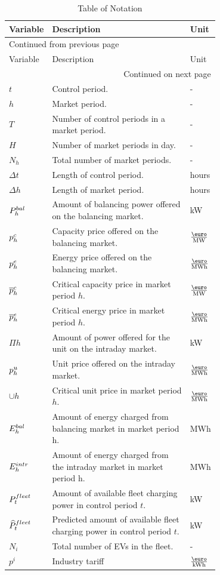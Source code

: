 \documentclass[a4paper, 12pt]{article}
\begin{document}
\begin{longtable}{l|p{0.7\linewidth}|l}
\caption[Table of Notation]{Table of Notation \label{table-notation}}
\\
\hline
\hline
Variable & Description & Unit\\
\hline
\endfirsthead
\multicolumn{3}{l}{Continued from previous page} \\
\hline

Variable & Description & Unit \\

\hline
\endhead
\hline\multicolumn{3}{r}{Continued on next page} \\
\endfoot
\endlastfoot
\hline
\(t\) & Control period. & -\\
\(h\) & Market period. & -\\
\(T\) & Number of control periods in a market period. & -\\
\(H\) & Number of market periods in day. & -\\
\(N_h\) & Total number of market periods. & -\\
\(\Delta t\) & Length of control period. & hours\\
\(\Delta h\) & Length of market period. & hours\\
\hline
\(P^{bal}_{h}\) & Amount of balancing power offered on the balancing market. & kW\\
\(p^c_{h}\) & Capacity price offered on the balancing market. & \(\emw\)\\
\(p^e_{h}\) & Energy price offered on the balancing market. & \(\emwh\)\\
\(\overline p^c_{h}\) & Critical capacity price in market period \(h\). & \(\emw\)\\
\(\overline p^e_{h}\) & Critical energy price in market period \(h\). & \(\emwh\)\\
\hline
\(\Pi{h}\) & Amount of power offered for the unit on the intraday market. & kW\\
\(p^u_{h}\) & Unit price offered on the intraday market. & \(\emwh\)\\
\(\cup{h}\) & Critical unit price in market period \(h\). & \(\emwh\)\\
\hline
\(E^{bal}_{h}\) & Amount of energy charged from balancing market in market period h. & MWh\\
\(E^{intr}_{h}\) & Amount of energy charged from the intraday market in market period h. & MWh\\
\hline
\(P^{fleet}_{t}\) & Amount of available fleet charging power in control period \(t\). & kW\\
\(\widehat{P}^{fleet}_{t}\) & Predicted amount of available fleet charging power in control period \(t\). & kW\\
\hline
\(N_i\) & Total number of EVs in the fleet. & -\\
\(p^{i}\) & Industry tariff & \(\ekwh\)\\
\hline
\hline
\end{longtable}
\end{document}
